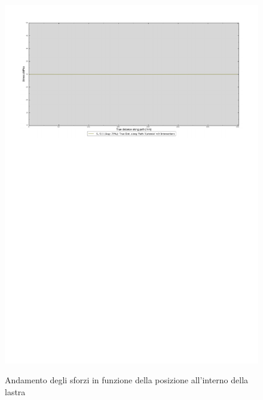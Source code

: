 \begin{figure}
{\includegraphics[width=\textwidth,trim=0 0.6cm 0 3cm,clip]{rel2/img2/GraficoPathCostante.pdf}}
\caption{Andamento degli sforzi in funzione della posizione all'interno della lastra} 
\label{fig:Grafici}
\end{figure}

